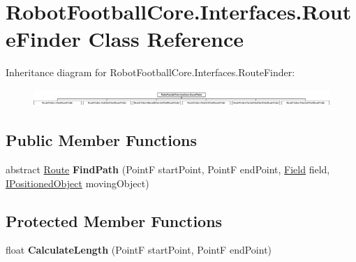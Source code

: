 \hypertarget{class_robot_football_core_1_1_interfaces_1_1_route_finder}{\section{Robot\-Football\-Core.\-Interfaces.\-Route\-Finder Class Reference}
\label{class_robot_football_core_1_1_interfaces_1_1_route_finder}
}
Inheritance diagram for Robot\-Football\-Core.\-Interfaces.\-Route\-Finder\-:\begin{figure}[H]
\begin{center}
\leavevmode
\includegraphics[height=0.643678cm]{class_robot_football_core_1_1_interfaces_1_1_route_finder}
\end{center}
\end{figure}
\subsection*{Public Member Functions}
\begin{DoxyCompactItemize}
\item 
\hypertarget{class_robot_football_core_1_1_interfaces_1_1_route_finder_aa188bb8f80aba481519aa43becac67ae}{abstract \hyperlink{class_robot_football_core_1_1_route_objects_1_1_route}{Route} {\bfseries Find\-Path} (Point\-F start\-Point, Point\-F end\-Point, \hyperlink{class_robot_football_core_1_1_objects_1_1_field}{Field} field, \hyperlink{interface_robot_football_core_1_1_interfaces_1_1_i_positioned_object}{I\-Positioned\-Object} moving\-Object)}\label{class_robot_football_core_1_1_interfaces_1_1_route_finder_aa188bb8f80aba481519aa43becac67ae}

\end{DoxyCompactItemize}
\subsection*{Protected Member Functions}
\begin{DoxyCompactItemize}
\item 
\hypertarget{class_robot_football_core_1_1_interfaces_1_1_route_finder_aeb775168886a0decf76ffff3d2d8ef15}{float {\bfseries Calculate\-Length} (Point\-F start\-Point, Point\-F end\-Point)}\label{class_robot_football_core_1_1_interfaces_1_1_route_finder_aeb775168886a0decf76ffff3d2d8ef15}

\end{DoxyCompactItemize}
